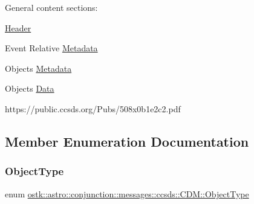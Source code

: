 General content sections\+:
\begin{DoxyItemize}
\item \hyperlink{structostk_1_1astro_1_1conjunction_1_1messages_1_1ccsds_1_1_c_d_m_1_1_header}{Header}
\item Event Relative \hyperlink{structostk_1_1astro_1_1conjunction_1_1messages_1_1ccsds_1_1_c_d_m_1_1_metadata}{Metadata}
\item Objects \hyperlink{structostk_1_1astro_1_1conjunction_1_1messages_1_1ccsds_1_1_c_d_m_1_1_metadata}{Metadata}
\item Objects \hyperlink{structostk_1_1astro_1_1conjunction_1_1messages_1_1ccsds_1_1_c_d_m_1_1_data}{Data}
\end{DoxyItemize}

https\+://public.ccsds.\+org/\+Pubs/508x0b1e2c2.pdf 

\subsection{Member Enumeration Documentation}
\mbox{\label{classostk_1_1astro_1_1conjunction_1_1messages_1_1ccsds_1_1_c_d_m_a9ef446f2327904fc0516249120ec9d71}} 
\subsubsection{\texorpdfstring{Object\+Type}{ObjectType}}
{\footnotesize\ttfamily enum \hyperlink{classostk_1_1astro_1_1conjunction_1_1messages_1_1ccsds_1_1_c_d_m_a9ef446f2327904fc0516249120ec9d71}{ostk\+::astro\+::conjunction\+::messages\+::ccsds\+::\+C\+D\+M\+::\+Object\+Type}\hspace{0.3cm}{\ttfamily [strong]}}

